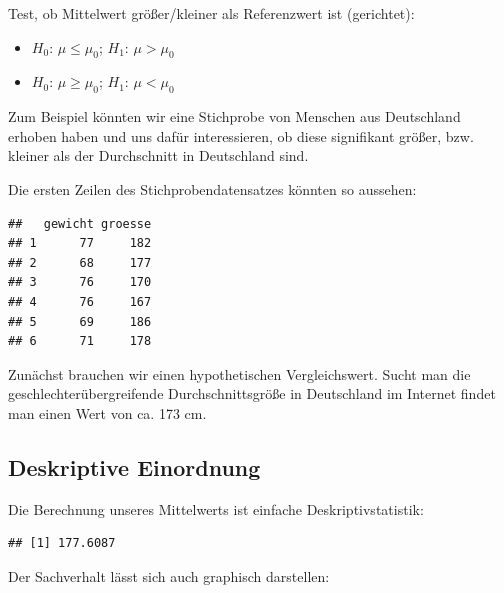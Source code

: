 \documentclass[
]{book}
\newenvironment{Shaded}{\begin{snugshade}}{\end{snugshade}}
\newcommand{\FunctionTok}[1]{\textcolor[rgb]{0.00,0.00,0.00}{#1}}
\newcommand{\NormalTok}[1]{#1}
\newcommand{\SpecialCharTok}[1]{\textcolor[rgb]{0.00,0.00,0.00}{#1}}
\providecommand{\tightlist}{%
  \setlength{\itemsep}{0pt}\setlength{\parskip}{0pt}}
\begin{document}
Test, ob Mittelwert größer/kleiner als Referenzwert ist (gerichtet):

\begin{itemize}
\tightlist
\item
  \(H_0\): \(μ≤μ_{0}\); \(H_1\): \(μ>μ_{0}\)
\item
  \(H_0\): \(μ≥μ_{0}\); \(H_1\): \(μ<μ_{0}\)
\end{itemize}

Zum Beispiel könnten wir eine Stichprobe von Menschen aus Deutschland erhoben haben und uns dafür interessieren, ob diese signifikant größer, bzw. kleiner als der Durchschnitt in Deutschland sind.

Die ersten Zeilen des Stichprobendatensatzes könnten so aussehen:

\begin{verbatim}
##   gewicht groesse
## 1      77     182
## 2      68     177
## 3      76     170
## 4      76     167
## 5      69     186
## 6      71     178
\end{verbatim}

Zunächst brauchen wir einen hypothetischen Vergleichswert. Sucht man die geschlechterübergreifende Durchschnittsgröße in Deutschland im Internet findet man einen Wert von ca. 173 cm.

\hypertarget{deskriptive-einordnung}{%
\subsection{Deskriptive Einordnung}\label{deskriptive-einordnung}}

Die Berechnung unseres Mittelwerts ist einfache Deskriptivstatistik:

\begin{Shaded}
\end{Shaded}

\begin{verbatim}
## [1] 177.6087
\end{verbatim}

Der Sachverhalt lässt sich auch graphisch darstellen:
\end{document}
